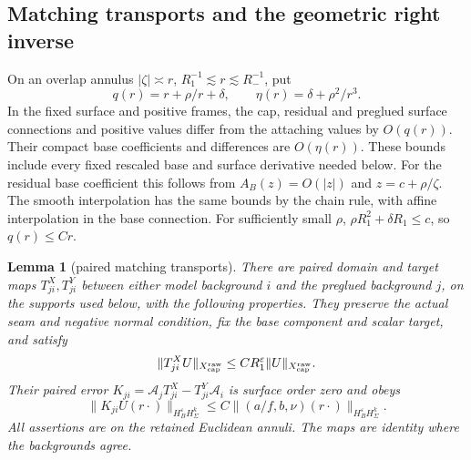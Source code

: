 \documentclass[11pt]{amsart}
\newtheorem{lemma}[theorem]{Lemma}
\theoremstyle{definition}
\theoremstyle{remark}
\theoremstyle{plain}
\begin{document}
\subsection{Matching transports and the geometric right inverse}

On an overlap annulus $|\zeta|\asymp r$, $R_1^{-1}\lesssim r
\lesssim R_-^{-1}$, put
\begin{equation}\label{eq:gluing-overlap-coefficients}
                    q(r)=r+\rho/r+\delta,\qquad
                    \eta(r)=\delta+\rho^2/r^3.
\end{equation}
In the fixed surface and positive frames, the cap, residual and
preglued surface connections and positive values differ from the
attaching values by $O(q(r))$. Their compact base coefficients
and differences are $O(\eta(r))$. These bounds include every
fixed rescaled base and surface derivative needed below. For the
residual base coefficient this follows from $A_B(z)=O(|z|)$
and $z=c+\rho/\zeta$. The smooth interpolation has the same
bounds by the chain rule, with affine interpolation in the base
connection. For sufficiently small $\rho$,
$\rho R_1^2+\delta R_1\leq c$, so $q(r)\leq Cr$.

\begin{lemma}[paired matching transports]\label{lem:gluing-paired-transports}
There are paired domain and target maps $T^X_{ji},T^Y_{ji}$
between either model background $i$ and the preglued background $j$,
on the supports used below, with the following properties. They
preserve the actual seam and negative normal condition, fix the base
component and scalar target, and satisfy
\begin{equation}\label{eq:gluing-transport-graph}
 \|T^X_{ji}U\|_{X^{\rm raw}_{\rm cap}}
                 \leq CR_1^\varepsilon\|U\|_{X^{\rm raw}_{\rm cap}}.
\end{equation}
Their paired error $K_{ji}=\mathcal A_jT^X_{ji}-T^Y_{ji}\mathcal A_i$
is surface order zero and obeys
\begin{equation}\label{eq:gluing-paired-error}
 \|K_{ji}U(r\cdot)\|_{H_B^\varepsilon H^k_\Sigma}
                       \leq C\|(a/f,b,\nu)(r\cdot)
                                                   \|_{H_B^\varepsilon H^k_\Sigma}.
\end{equation}
All assertions are on the retained Euclidean annuli. The maps are
identity where the backgrounds agree.
\end{lemma}
\end{document}
